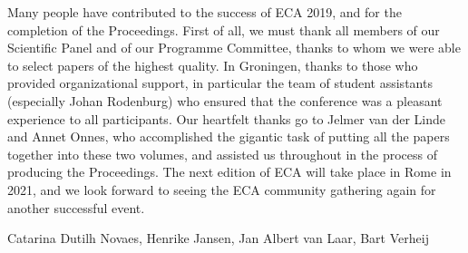 Many people have contributed to the success of ECA 2019, and for the completion of the Proceedings. First of all, we must thank all members of our Scientific Panel and of our Programme Committee, thanks to whom we were able to select papers of the highest quality. In Groningen, thanks to those who provided organizational support, in particular the team of student assistants (especially Johan Rodenburg) who ensured that the conference was a pleasant experience to all participants. Our heartfelt thanks go to Jelmer van der Linde and Annet Onnes, who accomplished the gigantic task of putting all the papers together into these two volumes, and assisted us throughout in the process of producing the Proceedings.
The next edition of ECA will take place in Rome in 2021, and we look forward to seeing the ECA community gathering again for another successful event.


Catarina Dutilh Novaes, Henrike Jansen, Jan Albert van Laar, Bart Verheij